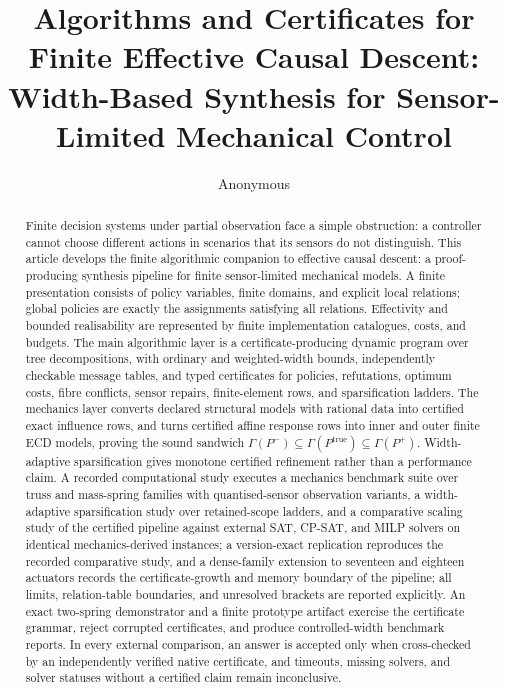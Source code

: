 \documentclass[11pt]{article}
\title{Algorithms and Certificates for Finite Effective Causal Descent:\\
Width-Based Synthesis for Sensor-Limited Mechanical Control}
\author{Anonymous}
\date{}
\theoremstyle{plain}
\theoremstyle{definition}
\theoremstyle{remark}
\begin{document}
\maketitle

\begin{abstract}
Finite decision systems under partial observation face a simple obstruction: a
controller cannot choose different actions in scenarios that its sensors do not
distinguish.  This article develops the finite algorithmic companion to
effective causal descent: a proof-producing synthesis pipeline for finite
sensor-limited mechanical models.  A finite presentation consists of policy variables, finite domains, and
explicit local relations; global policies are exactly the assignments satisfying
all relations.  Effectivity and bounded realisability are represented by finite
implementation catalogues, costs, and budgets.  The main algorithmic layer is a
certificate-producing dynamic program over tree decompositions, with ordinary
and weighted-width bounds, independently checkable message tables, and typed
certificates for policies, refutations, optimum costs, fibre conflicts, sensor
repairs, finite-element rows, and sparsification ladders.  The mechanics layer
converts declared structural models with rational data into certified exact
influence rows, and turns certified affine response rows into inner and outer
finite ECD models, proving the sound sandwich
\(\Gamma(P^-)\subseteq\Gamma(P^{\mathrm{true}})\subseteq\Gamma(P^+)\).
Width-adaptive sparsification gives monotone certified refinement rather than a
performance claim.  A recorded computational study executes a mechanics
benchmark suite over truss and mass-spring families with quantised-sensor
observation variants, a width-adaptive sparsification study over retained-scope
ladders, and a comparative scaling study of the certified pipeline against
external SAT, CP-SAT, and MILP solvers on identical mechanics-derived
instances; a version-exact replication reproduces the recorded comparative
study, and a dense-family extension to seventeen and eighteen actuators
records the certificate-growth and memory boundary of the pipeline; all
limits, relation-table boundaries, and unresolved brackets are
reported explicitly.  An exact two-spring demonstrator and a finite prototype
artifact exercise the certificate grammar, reject corrupted certificates, and
produce controlled-width benchmark reports.  In every external comparison, an
answer is accepted only when cross-checked by an independently verified native
certificate, and timeouts, missing solvers, and solver statuses without a
certified claim remain inconclusive.
\end{abstract}
\end{document}
